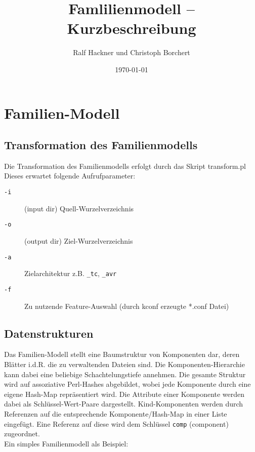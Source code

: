 \documentclass[a4paper]{article}
\title{Famlilienmodell -- Kurzbeschreibung}
\author{Ralf Hackner und Christoph Borchert}
\date{\today}
\begin{document}
\maketitle
\tableofcontents

\section{Familien-Modell}
\subsection{Transformation des Familienmodells}
Die Transformation des Familienmodells erfolgt durch das Skript transform.pl
Dieses erwartet folgende Aufrufparameter:
\begin{description}
	\item[\texttt{-i}] (input dir) Quell-Wurzelverzeichnis
	\item[\texttt{-o}] (output dir) Ziel-Wurzelverzeichnis
	\item[\texttt{-a}] Zielarchitektur z.B. \texttt{\_tc}, \texttt{\_avr}
	\item[\texttt{-f}] Zu nutzende Feature-Auswahl (durch kconf erzeugte *.conf Datei) 
\end{description}
\subsection{Datenstrukturen}

Das Familien-Modell stellt eine Baumstruktur von Komponenten dar, deren Blätter i.d.R. die zu 
verwaltenden Dateien sind. Die Komponenten-Hierarchie kann dabei eine beliebige
Schachtelungstiefe annehmen. Die gesamte Struktur wird auf assoziative Perl-Hashes
abgebildet, wobei jede Komponente durch eine eigene Hash-Map repräsentiert wird.
Die Attribute einer Komponente werden dabei als Schlüssel-Wert-Paare dargestellt.
Kind-Komponenten werden durch Referenzen auf die entsprechende Komponente/Hash-Map in einer Liste eingefügt.
Eine Referenz auf diese wird dem Schlüssel \texttt{comp} (component) zugeordnet.\\
Ein simples Familienmodell als Beispiel:

\end{document}
